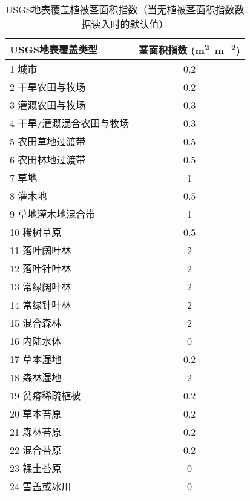 \begin{table}[htbp]
  \centering
  \caption[USGS地表覆盖植被茎面积指数]{USGS地表覆盖植被茎面积指数（当无植被茎面积指数数据读入时的默认值）}
  \label{tab:USGS地表覆盖植被茎面积指数}
  \begin{tabular}{@{}lc@{}}
    \toprule
    USGS地表覆盖类型          & 茎面积指数 (\unit{m^2.m^{-2}}) \\ \midrule
    1 城市                    & 0.2                            \\
    2 干旱农田与牧场          & 0.2                            \\
    3 灌溉农田与牧场          & 0.3                            \\
    4 干旱/灌溉混合农田与牧场 & 0.3                            \\
    5 农田草地过渡带          & 0.5                            \\
    6 农田林地过渡带          & 0.5                            \\
    7 草地                    & 1                              \\
    8 灌木地                  & 0.5                            \\
    9 草地灌木地混合带        & 1                              \\
    10 稀树草原               & 0.5                            \\
    11 落叶阔叶林             & 2                              \\
    12 落叶针叶林             & 2                              \\
    13 常绿阔叶林             & 2                              \\
    14 常绿针叶林             & 2                              \\
    15 混合森林               & 2                              \\
    16 内陆水体               & 0                              \\
    17 草本湿地               & 0.2                            \\
    18 森林湿地               & 2                              \\
    19 贫瘠稀疏植被           & 0.2                            \\
    20 草本苔原               & 0.2                            \\
    21 森林苔原               & 0.2                            \\
    22 混合苔原               & 0.2                            \\
    23 裸土苔原               & 0                              \\
    24 雪盖或冰川             & 0                              \\ \bottomrule
  \end{tabular}
\end{table}

